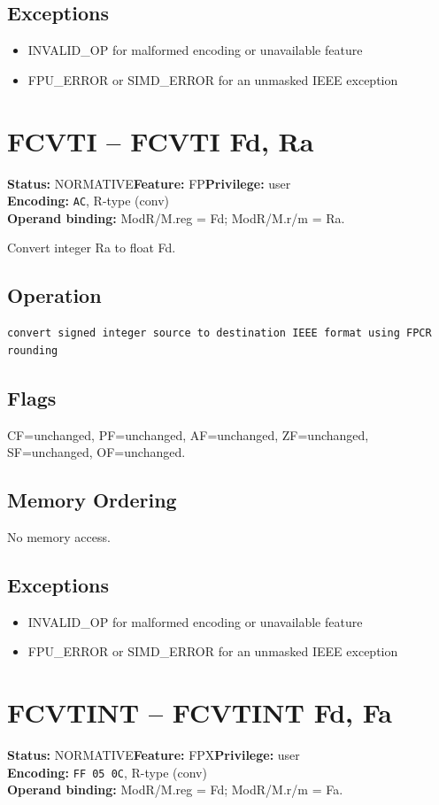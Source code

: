 \documentclass[10pt]{article}
\begin{document}
\subsection*{Exceptions}
\begin{itemize}
\item INVALID\_OP for malformed encoding or unavailable feature
\item FPU\_ERROR or SIMD\_ERROR for an unmasked IEEE exception
\end{itemize}
\clearpage

\section{FCVTI -- FCVTI Fd, Ra}
\textbf{Status:} NORMATIVE\quad \textbf{Feature:} FP\quad \textbf{Privilege:} user\\
\textbf{Encoding:} \texttt{AC}, R-type (conv)\\
\textbf{Operand binding:} ModR/M.reg = Fd; ModR/M.r/m = Ra.

Convert integer Ra to float Fd.

\subsection*{Operation}
\begin{lstlisting}
convert signed integer source to destination IEEE format using FPCR rounding
\end{lstlisting}
\subsection*{Flags}
CF=unchanged, PF=unchanged, AF=unchanged, ZF=unchanged, SF=unchanged, OF=unchanged.
\subsection*{Memory Ordering}
No memory access.
\subsection*{Exceptions}
\begin{itemize}
\item INVALID\_OP for malformed encoding or unavailable feature
\item FPU\_ERROR or SIMD\_ERROR for an unmasked IEEE exception
\end{itemize}
\clearpage

\section{FCVTINT -- FCVTINT Fd, Fa}
\textbf{Status:} NORMATIVE\quad \textbf{Feature:} FPX\quad \textbf{Privilege:} user\\
\textbf{Encoding:} \texttt{FF 05 0C}, R-type (conv)\\
\textbf{Operand binding:} ModR/M.reg = Fd; ModR/M.r/m = Fa.
\end{document}
